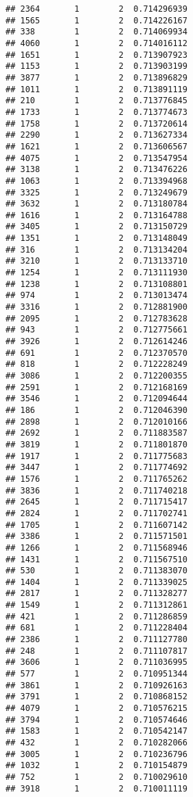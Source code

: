 \documentclass[
]{article}
\begin{document}
\begin{verbatim}
## 2364       1        2  0.714296939
## 1565       1        2  0.714226167
## 338        1        2  0.714069934
## 4060       1        2  0.714016112
## 1651       1        2  0.713907923
## 1153       1        2  0.713903199
## 3877       1        2  0.713896829
## 1011       1        2  0.713891119
## 210        1        2  0.713776845
## 1733       1        2  0.713774673
## 1758       1        2  0.713720614
## 2290       1        2  0.713627334
## 1621       1        2  0.713606567
## 4075       1        2  0.713547954
## 3138       1        2  0.713476226
## 1063       1        2  0.713394968
## 3325       1        2  0.713249679
## 3632       1        2  0.713180784
## 1616       1        2  0.713164788
## 3405       1        2  0.713150729
## 1351       1        2  0.713148049
## 316        1        2  0.713134204
## 3210       1        2  0.713133710
## 1254       1        2  0.713111930
## 1238       1        2  0.713108801
## 974        1        2  0.713013474
## 3316       1        2  0.712881900
## 2095       1        2  0.712783628
## 943        1        2  0.712775661
## 3926       1        2  0.712614246
## 691        1        2  0.712370570
## 818        1        2  0.712228249
## 3086       1        2  0.712200355
## 2591       1        2  0.712168169
## 3546       1        2  0.712094644
## 186        1        2  0.712046390
## 2898       1        2  0.712010166
## 2692       1        2  0.711883587
## 3819       1        2  0.711801870
## 1917       1        2  0.711775683
## 3447       1        2  0.711774692
## 1576       1        2  0.711765262
## 3836       1        2  0.711740218
## 2645       1        2  0.711715417
## 2824       1        2  0.711702741
## 1705       1        2  0.711607142
## 3386       1        2  0.711571501
## 1266       1        2  0.711568946
## 1431       1        2  0.711567510
## 530        1        2  0.711383070
## 1404       1        2  0.711339025
## 2817       1        2  0.711328277
## 1549       1        2  0.711312861
## 421        1        2  0.711286859
## 681        1        2  0.711228404
## 2386       1        2  0.711127780
## 248        1        2  0.711107817
## 3606       1        2  0.711036995
## 577        1        2  0.710951344
## 3861       1        2  0.710926163
## 3791       1        2  0.710868152
## 4079       1        2  0.710576215
## 3794       1        2  0.710574646
## 1583       1        2  0.710542147
## 432        1        2  0.710282066
## 3005       1        2  0.710236796
## 1032       1        2  0.710154879
## 752        1        2  0.710029610
## 3918       1        2  0.710011119

\end{verbatim}
\end{document}
